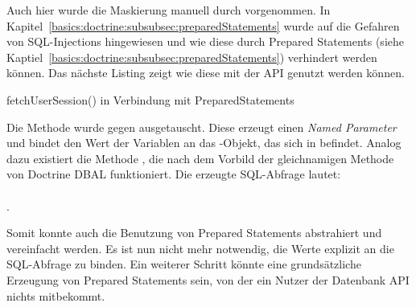 Auch hier wurde die Maskierung manuell durch  vorgenommen. In Kapitel~\ref{basics:doctrine:subsubsec:preparedStatements} wurde auf die Gefahren von SQL-Injections hingewiesen und wie diese durch Prepared Statements (siehe Kaptiel~\ref{basics:doctrine:subsubsec:preparedStatements}) verhindert werden können. Das nächste Listing zeigt wie diese mit der API genutzt werden können.

\begin{listing}[H]
\begin{phpcode}
$query = $this->db->createUpdateQuery();
$query->update($this->session_table)
  ->set('ses_tstamp', $GLOBALS['EXEC_TIME'])
  ->where(
    $query->expr->equals('ses_id', $query->bindValue($this->id)),
    $query->expr->equals('ses_name', $query->bindValue($this->name))
  )->execute();
}
\end{phpcode}
\caption{fetchUserSession() in Verbindung mit PreparedStatements}
\label{lst:fetchUserSessionAfterMigrationPreparedStatements}
\end{listing}


Die Methode  wurde gegen  ausgetauscht. Diese erzeugt einen \textit{Named Parameter} und bindet den Wert der Variablen an das -Objekt, das sich in  befindet. Analog dazu existiert die Methode , die nach dem Vorbild der gleichnamigen Methode von Doctrine DBAL funktioniert. Die erzeugte SQL-Abfrage lautet:\\ \\ .

Somit konnte auch die Benutzung von Prepared Statements abstrahiert und vereinfacht werden. Es ist nun nicht mehr notwendig, die Werte explizit an die SQL-Abfrage zu binden. Ein weiterer Schritt könnte eine grundsätzliche Erzeugung von Prepared Statements sein, von der ein Nutzer der Datenbank API nichts mitbekommt.

